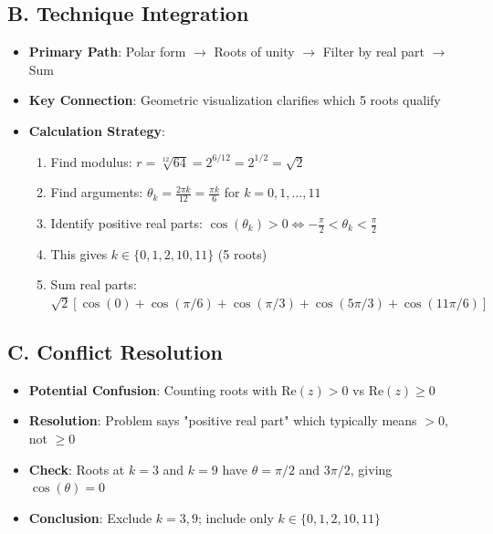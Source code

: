 \documentclass[11pt]{article}
\begin{document}
\begin{techniquesbox}
\subsection*{B. Technique Integration}
\begin{itemize}[leftmargin=*]
    \item \textbf{Primary Path}: Polar form $\to$ Roots of unity $\to$ Filter by real part $\to$ Sum
    \item \textbf{Key Connection}: Geometric visualization clarifies which 5 roots qualify
    \item \textbf{Calculation Strategy}: 
    \begin{enumerate}
        \item Find modulus: $r = \sqrt[12]{64} = 2^{6/12} = 2^{1/2} = \sqrt{2}$
        \item Find arguments: $\theta_k = \frac{2\pi k}{12} = \frac{\pi k}{6}$ for $k=0,1,\ldots,11$
        \item Identify positive real parts: $\cos(\theta_k) > 0 \iff -\frac{\pi}{2} < \theta_k < \frac{\pi}{2}$
        \item This gives $k \in \{0, 1, 2, 10, 11\}$ (5 roots)
        \item Sum real parts: $\sqrt{2}[\cos(0) + \cos(\pi/6) + \cos(\pi/3) + \cos(5\pi/3) + \cos(11\pi/6)]$
    \end{enumerate}
\end{itemize}

\subsection*{C. Conflict Resolution}
\begin{itemize}[leftmargin=*]
    \item \textbf{Potential Confusion}: Counting roots with $\text{Re}(z) > 0$ vs $\text{Re}(z) \geq 0$
    \item \textbf{Resolution}: Problem says "positive real part" which typically means $>0$, not $\geq 0$
    \item \textbf{Check}: Roots at $k=3$ and $k=9$ have $\theta = \pi/2$ and $3\pi/2$, giving $\cos(\theta)=0$
    \item \textbf{Conclusion}: Exclude $k=3,9$; include only $k \in \{0,1,2,10,11\}$
\end{itemize}
\end{techniquesbox}
\end{document}
